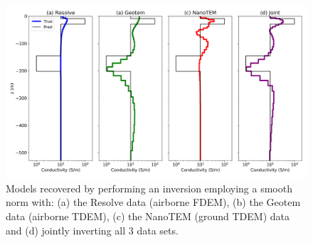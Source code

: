 \begin{figure}
    \begin{center}
    \includegraphics[width=0.8\columnwidth]{figures/independent-inversions.png}
    \end{center}
\caption{
    Models recovered by performing an inversion employing a smooth norm with:
    (a) the Resolve data (airborne FDEM), (b) the Geotem data (airborne TDEM), (c) the NanoTEM (ground TDEM) data and (d) jointly inverting all 3 data sets.
}
\label{fig:independent-inversions}
\end{figure}
